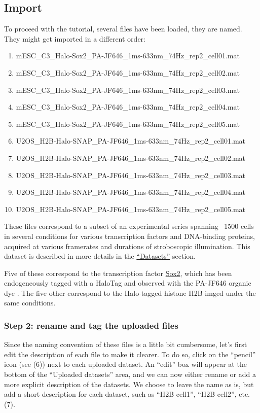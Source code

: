 \subsection{Import}

To proceed with the tutorial, several files have been loaded, they are named. They might get imported in a different order:

\begin{enumerate}
\item mESC\_C3\_Halo-Sox2\_PA-JF646\_1ms-633nm\_74Hz\_rep2\_cell01.mat
\item mESC\_C3\_Halo-Sox2\_PA-JF646\_1ms-633nm\_74Hz\_rep2\_cell02.mat
\item mESC\_C3\_Halo-Sox2\_PA-JF646\_1ms-633nm\_74Hz\_rep2\_cell03.mat
\item mESC\_C3\_Halo-Sox2\_PA-JF646\_1ms-633nm\_74Hz\_rep2\_cell04.mat
\item mESC\_C3\_Halo-Sox2\_PA-JF646\_1ms-633nm\_74Hz\_rep2\_cell05.mat
\item U2OS\_H2B-Halo-SNAP\_PA-JF646\_1ms-633nm\_74Hz\_rep2\_cell01.mat
\item U2OS\_H2B-Halo-SNAP\_PA-JF646\_1ms-633nm\_74Hz\_rep2\_cell02.mat
\item U2OS\_H2B-Halo-SNAP\_PA-JF646\_1ms-633nm\_74Hz\_rep2\_cell03.mat
\item U2OS\_H2B-Halo-SNAP\_PA-JF646\_1ms-633nm\_74Hz\_rep2\_cell04.mat
\item U2OS\_H2B-Halo-SNAP\_PA-JF646\_1ms-633nm\_74Hz\_rep2\_cell05.mat  
\end{enumerate}

These files correspond to a subset of an experimental series spanning ~1500 cells in several conditions for various transcription factors and DNA-binding proteins, acquired at various framerates and durations of stroboscopic illumination. This dataset is described in more details in the \href{https://spoton.berkeley.edu/SPTGUI/docs/latest#datasets-1}{``Datasets''} section.

Five of these correspond to the transcription factor \href{https://en.wikipedia.org/wiki/SOX2}{Sox2}, which has been endogeneously tagged with a HaloTag and observed with the PA-JF646 organic dye \cite{grimm_general_2015}. The five other correspond to the Halo-tagged histone H2B imged under the same conditions.

\subsubsection{Step 2: rename and tag the uploaded files}
Since the naming convention of these files is a little bit cumbersome, let's first edit the description of each file to make it clearer. To do so, click on the ``pencil'' icon (see (6)) next to each uploaded dataset. An ``edit'' box will appear at the bottom of the ``Uploaded datasets'' area, and we can now either rename or add a more explicit description of the datasets. We choose to leave the name as is, but add a short description for each dataset, such as ``H2B cell1'', ``H2B cell2'', etc. (7).

